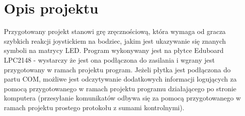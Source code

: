 \documentclass[a4paper, portrait,11pt]{article}
\begin{document}

\section{Opis projektu}
Przygotowany projekt stanowi grę zręcznościową, która wymaga od gracza szybkich
reakcji joystickiem na bodziec, jakim jest ukazywanie się znanych symboli na
matrycy LED. Program wykonywany jest na płytce Eduboard LPC2148 - wystarczy
że jest ona podłączona do zasilania i wgrany jest przygotowany w ramach projektu
program. Jeżeli płytka jest podłączona do partu COM, możliwe jest odczytywanie
dodatkowych informacji logujących za pomocą przygotowanego w ramach projektu
programu działającego po stronie komputera (przesyłanie komunikatów odbywa
się za pomocą przygotowanego w ramach projektu prostego protokołu z sumami
kontrolnymi).\\
\end{document}
